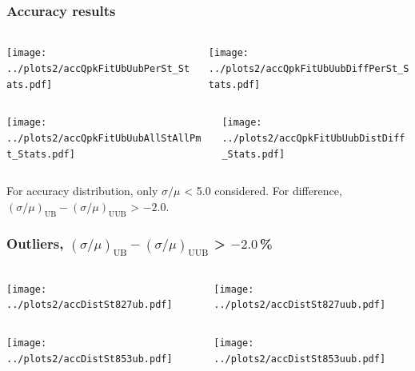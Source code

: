 \documentclass[aspectratio=169]{beamer}
\begin{document}
\begin{frame}
  \frametitle{Accuracy results}
  \vspace{0.5cm}
  \begin{columns}
    \begin{column}{0.5\textwidth}
      \texttt{[image: ../plots2/accQpkFitUbUubPerSt\_Stats.pdf]}
    \end{column}
    \begin{column}{0.5\textwidth}
      \texttt{[image: ../plots2/accQpkFitUbUubDiffPerSt\_Stats.pdf]}
    \end{column}
  \end{columns}
  \begin{columns}
    \begin{column}{0.5\textwidth}
      \texttt{[image: ../plots2/accQpkFitUbUubAllStAllPmt\_Stats.pdf]}
    \end{column}
    \begin{column}{0.5\textwidth}
      \texttt{[image: ../plots2/accQpkFitUbUubDistDiff\_Stats.pdf]}
    \end{column}
  \end{columns}
  {\scriptsize
  For accuracy distribution, only $\sigma/\mu$ < 5.0 considered.
  For difference, $(\sigma/\mu)_{\mathrm{UB}} - (\sigma/\mu)_{\mathrm{UUB}}$
  > $-2.0$.
  }
\end{frame}

\begin{frame}
  \frametitle{Outliers, $(\sigma/\mu)_{\mathrm{UB}} -
  (\sigma/\mu)_{\mathrm{UUB}}$ > $-2.0$\,\% }
  \vspace{0.5cm}
  \begin{columns}
    \begin{column}{0.5\textwidth}
      \texttt{[image: ../plots2/accDistSt827ub.pdf]}
    \end{column}
    \begin{column}{0.5\textwidth}
      \texttt{[image: ../plots2/accDistSt827uub.pdf]}
    \end{column}
  \end{columns}
  \begin{columns}
    \begin{column}{0.5\textwidth}
      \texttt{[image: ../plots2/accDistSt853ub.pdf]}
    \end{column}
    \begin{column}{0.5\textwidth}
      \texttt{[image: ../plots2/accDistSt853uub.pdf]}
    \end{column}
  \end{columns}
\end{frame}
\end{document}
